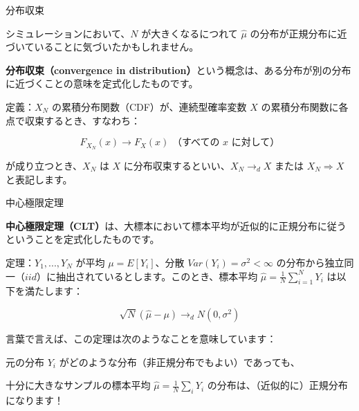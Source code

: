 \documentclass[11pt,handout]{beamer}
\newenvironment{wideitemize}{\itemize\addtolength{\itemsep}{10pt}}{\enditemize}
\begin{document}
\begin{frame}{分布収束}
	
	\begin{wideitemize}

		\item
		シミュレーションにおいて、$N$ が大きくなるにつれて $\hat\mu$ の分布が正規分布に近づいていることに気づいたかもしれません。
		
		\item
		\textbf{分布収束（convergence in distribution）}という概念は、ある分布が別の分布に近づくことの意味を定式化したものです。
		
		\pause
		\item
		定義：$X_N$ の累積分布関数（CDF）が、連続型確率変数 $X$ の累積分布関数に各点で収束するとき、すなわち：
		
		$$F_{X_N}(x) \rightarrow F_{X}(x) \text{ （すべての } x \text{ に対して）}$$ 
		
		が成り立つとき、$X_N$ は $X$ に分布収束するといい、$X_N \rightarrow_d X$ または $X_N \Rightarrow X$ と表記します。
		
	\end{wideitemize}
	
\end{frame}

\begin{frame}{中心極限定理}
\begin{wideitemize}

\item
\textbf{中心極限定理（CLT）}は、大標本において標本平均が近似的に正規分布に従うということを定式化したものです。

\pause
\item
定理：$Y_1,...,Y_N$ が平均 $\mu = E[Y_i]$、分散 $Var(Y_i) = \sigma^2 < \infty$ の分布から独立同一（$iid$）に抽出されているとします。このとき、標本平均 $\hat\mu = \frac{1}{N} \sum_{i=1}^N Y_i$ は以下を満たします：

$$ \sqrt{N} (\hat\mu - \mu) \rightarrow_d N(0, \sigma^2) $$

\pause
\item
言葉で言えば、この定理は次のようなことを意味しています：

\begin{enumerate}
\normalsize{
\item 
元の分布 $Y_i$ がどのような分布（非正規分布でもよい）であっても、

\item
十分に大きなサンプルの標本平均 $\hat\mu = \frac{1}{N} \sum_i Y_i$ の分布は、（近似的に）正規分布になります！
}
\end{enumerate}

\end{wideitemize}	

\end{frame}
\end{document}
